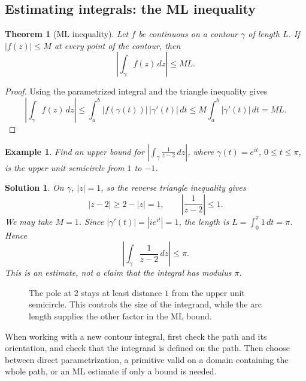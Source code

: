 \documentclass{report}
\newtheorem{theorem}{Theorem}
\newtheorem{example}{Example}
\newtheorem{solution}{Solution}
\begin{document}
\subsection{Estimating integrals: the ML inequality}

\begin{theorem}[ML inequality]
    Let $f$ be continuous on a contour $\gamma$ of length $L$. If
    $|f(z)|\leq M$ at every point of the contour, then
    \[
        \boxed{\displaystyle\left|\int_\gamma f(z)\,dz\right|\leq ML.}
    \]
\end{theorem}
\begin{proof}
    Using the parametrized integral and the triangle inequality gives
    \[
        \left|\int_\gamma f(z)\,dz\right|
        \leq\int_a^b |f(\gamma(t))|\,|\gamma'(t)|\,dt
        \leq M\int_a^b|\gamma'(t)|\,dt=ML.
    \]
\end{proof}

\begin{example}
    Find an upper bound for
    $\displaystyle\left|\int_\gamma\frac{1}{z-2}\,dz\right|$,
    where $\gamma(t)=e^{it}$, $0\leq t\leq\pi$, is the upper unit
    semicircle from $1$ to $-1$.
\end{example}
\begin{solution}
    On $\gamma$, $|z|=1$, so the reverse triangle inequality gives
    \[
        |z-2|\geq 2-|z|=1,
        \qquad \left|\frac{1}{z-2}\right|\leq1.
    \]
    We may take $M=1$. Since $|\gamma'(t)|=|ie^{it}|=1$, the length is
    $L=\int_0^\pi1\,dt=\pi$. Hence
    \[
        \left|\int_\gamma\frac{1}{z-2}\,dz\right|\leq\pi.
    \]
    This is an estimate, not a claim that the integral has modulus $\pi$.
\end{solution}

\begin{figure}[H]
    \centering
    \caption{The pole at $2$ stays at least distance $1$ from the upper
    unit semicircle. This controls the size of the integrand, while the
    arc length supplies the other factor in the ML bound.}
    \label{fig:integration-ml}
\end{figure}

\noindent
When working with a new contour integral, first check the path and its
orientation, and check that the integrand is defined on the path. Then
choose between direct parametrization, a primitive valid on a domain
containing the whole path, or an ML estimate if only a bound is needed.
\end{document}
